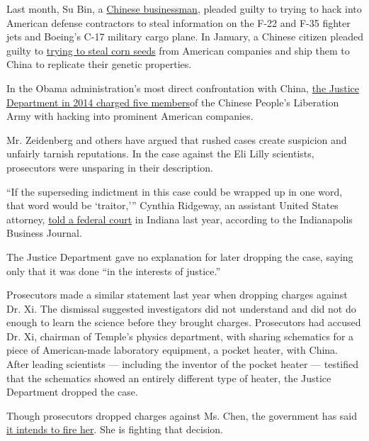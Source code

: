 Last month, Su Bin, a
\href{http://bigstory.ap.org/article/2eb94d3ffb764e81bddac91c948e1956/chinese-man-pleads-guilty-us-hacking-case}{Chinese
businessman}, pleaded guilty to trying to hack into American defense
contractors to steal information on the F-22 and F-35 fighter jets and
Boeing's C-17 military cargo plane. In January, a Chinese citizen
pleaded guilty to
\href{http://www.nytimes3xbfgragh.onion/2016/01/29/business/international/china-us-monsanto-dupont-corn.html}{trying
to steal corn seeds} from American companies and ship them to China to
replicate their genetic properties.

In the Obama administration's most direct confrontation with China,
\href{http://www.nytimes3xbfgragh.onion/2014/05/22/world/asia/hacking-charges-threaten-further-damage-to-chinese-american-relations.html}{the
Justice Department in 2014 charged five members}of the Chinese People's
Liberation Army with hacking into prominent American companies.

Mr. Zeidenberg and others have argued that rushed cases create suspicion
and unfairly tarnish reputations. In the case against the Eli Lilly
scientists, prosecutors were unsparing in their description.

``If the superseding indictment in this case could be wrapped up in one
word, that word would be `traitor,''' Cynthia Ridgeway, an assistant
United States attorney,
\href{http://www.ibj.com/articles/43949-lilly-scientists-stole-55-million-in-trade-secrets-indictment-alleges}{told
a federal court} in Indiana last year, according to the Indianapolis
Business Journal.

The Justice Department gave no explanation for later dropping the case,
saying only that it was done ``in the interests of justice.''

Prosecutors made a similar statement last year when dropping charges
against Dr. Xi. The dismissal suggested investigators did not understand
and did not do enough to learn the science before they brought charges.
Prosecutors had accused Dr. Xi, chairman of Temple's physics department,
with sharing schematics for a piece of American-made laboratory
equipment, a pocket heater, with China. After leading scientists ---
including the inventor of the pocket heater --- testified that the
schematics showed an entirely different type of heater, the Justice
Department dropped the case.

Though prosecutors dropped charges against Ms. Chen, the government has
said
\href{http://www.nytimes3xbfgragh.onion/2015/09/16/technology/chinese-american-cleared-of-spying-charges-now-faces-firing.html}{it
intends to fire her}. She is fighting that decision.

